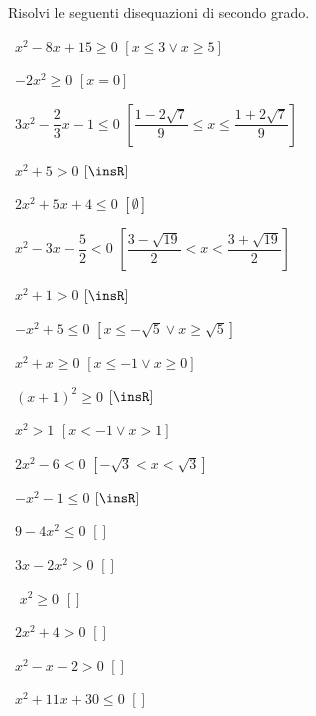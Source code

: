 \begin{esercizio}[\Ast]
 \label{ese:4.4}
Risolvi le seguenti disequazioni di secondo grado.
\vspace{\dy}
\begin{multicols}{2}
 \begin{enumeratea}
 \item~\(x^2-8x+15\ge 0\) \hfill \(\left[x\le 3\vee x\ge 5\right]\)
 \item~\(-2x^2\ge 0\) \hfill \(\left[x=0\right]\)
 \item~\(3x^2-\dfrac 2 3x-1\le 0\) 
  \hfill \(\left[\dfrac{1-2\sqrt 7} 9\le x\le \dfrac{1+2\sqrt 7} 9\right]\)
 \item~\(x^2+5>0\) \hfill \(\left[\insR\right]\)
 \item~\(2x^2+5x+4\le 0\) \hfill \(\left[\emptyset\right]\)
 \item~\(x^2-3x-\dfrac 5 2<0\) 
  \hfill \(\left[\dfrac{3-\sqrt{19}} 2<x<\dfrac{3+\sqrt{19}} 2\right]\)
 \item~\(x^2+1>0\) \hfill \(\left[\insR\right]\)
 \item~\(-x^2+5\le 0\) \hfill \(\left[x\le -\sqrt 5\vee x\ge \sqrt 5\right]\)
 \item~\(x^2+x\ge 0\) \hfill \(\left[x\le -1\vee x\ge 0\right]\)
 \item~\((x+1)^2\ge 0\) \hfill \(\left[\insR\right]\)
 \item~\(x^2>1\) \hfill \(\left[x<-1\vee x>1\right]\)
 \item~\(2x^2-6<0\) \hfill \(\left[-\sqrt 3<x<\sqrt 3\right]\)
 \item~\(-x^2-1\le 0\) \hfill \(\left[\insR\right]\)
 \item~\(9-4x^2\le 0\) \hfill \(\left[\right]\)
 \item~\(3x-2x^2>0\) \hfill \(\left[\right]\)
 \item~ \(x^2\ge 0\) \hfill \(\left[\right]\)
 \item~\(2x^2+4>0\) \hfill \(\left[\right]\)
 \item~\(x^2-x-2>0\) \hfill \(\left[\right]\)
 \item~\(x^2+11x+30\le 0\) \hfill \(\left[\right]\)
 \end{enumeratea}
 \end{multicols}
\end{esercizio}

